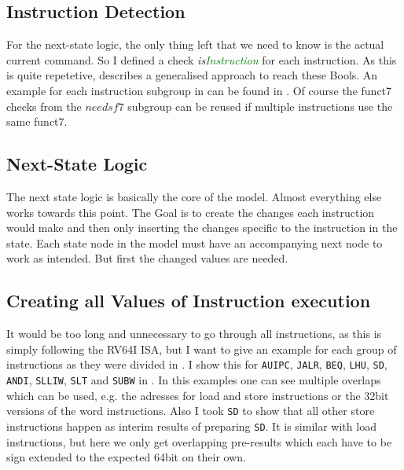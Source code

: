 \subsection{Instruction Detection}

For the next-state logic, the only thing left that we need to know is the
actual current command. So I defined a check
\textsl{is\textcolor{Green}{Instruction}} for each instruction. As this is
quite repetetive,  describes a generalised
approach to reach these Bools. An example for each instruction subgroup in
 can be found in .
Of course the funct7 checks from the $needsf7$ subgroup can be reused if
multiple instructions use the same funct7.




\subsection{Next-State Logic}
The next state logic is basically the core of the model. Almost everything else
works towards this point. The Goal is to create the changes each instruction
would make and then only inserting the changes specific to the instruction in
the state. Each state node in the model must have an accompanying next node to
work as intended. But first the changed values are needed.

\subsection{Creating all Values of Instruction execution}
It would be too long and unnecessary to go through all instructions, as this is
simply following the RV64I ISA, but I want to give an example for each group of
instructions as they were divided in . I show
this for \texttt{AUIPC}, \texttt{JALR}, \texttt{BEQ}, \texttt{LHU},
\texttt{SD}, \texttt{ANDI}, \texttt{SLLIW}, \texttt{SLT} and \texttt{SUBW} in
. In this examples one can see multiple overlaps which
can be used, e.g. the adresses for load and store instructions or the 32bit
versions of the word instructions. Also I took \texttt{SD} to show that all
other store instructions happen as interim results of preparing \texttt{SD}. It
is similar with load instructions, but here we only get overlapping pre-results
which each have to be sign extended to the expected 64bit on their own.

